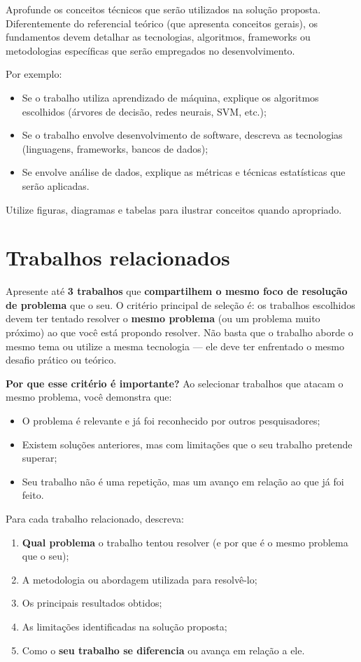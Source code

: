 \documentclass[
    12pt,                %
    openright,           %
    oneside,             %
    a4paper,             %
    english,             %
    brazil               %
]{abntex2}
\begin{document}
Aprofunde os conceitos técnicos que serão utilizados na solução proposta. Diferentemente do referencial teórico (que apresenta conceitos gerais), os fundamentos devem detalhar as tecnologias, algoritmos, frameworks ou metodologias específicas que serão empregados no desenvolvimento.

Por exemplo:
\begin{itemize}
    \item Se o trabalho utiliza aprendizado de máquina, explique os algoritmos escolhidos (árvores de decisão, redes neurais, SVM, etc.);
    \item Se o trabalho envolve desenvolvimento de software, descreva as tecnologias (linguagens, frameworks, bancos de dados);
    \item Se envolve análise de dados, explique as métricas e técnicas estatísticas que serão aplicadas.
\end{itemize}

Utilize figuras, diagramas e tabelas para ilustrar conceitos quando apropriado.

\section{Trabalhos relacionados}
\label{sec:trabalhos_relacionados}

Apresente até \textbf{3 trabalhos} que \textbf{compartilhem o mesmo foco de resolução de problema} que o seu. O critério principal de seleção é: os trabalhos escolhidos devem ter tentado resolver o \textbf{mesmo problema} (ou um problema muito próximo) ao que você está propondo resolver. Não basta que o trabalho aborde o mesmo tema ou utilize a mesma tecnologia --- ele deve ter enfrentado o mesmo desafio prático ou teórico.

\textbf{Por que esse critério é importante?} Ao selecionar trabalhos que atacam o mesmo problema, você demonstra que:
\begin{itemize}
    \item O problema é relevante e já foi reconhecido por outros pesquisadores;
    \item Existem soluções anteriores, mas com limitações que o seu trabalho pretende superar;
    \item Seu trabalho não é uma repetição, mas um avanço em relação ao que já foi feito.
\end{itemize}

Para cada trabalho relacionado, descreva:
\begin{enumerate}
    \item \textbf{Qual problema} o trabalho tentou resolver (e por que é o mesmo problema que o seu);
    \item A metodologia ou abordagem utilizada para resolvê-lo;
    \item Os principais resultados obtidos;
    \item As limitações identificadas na solução proposta;
    \item Como o \textbf{seu trabalho se diferencia} ou avança em relação a ele.
\end{enumerate}
\end{document}
